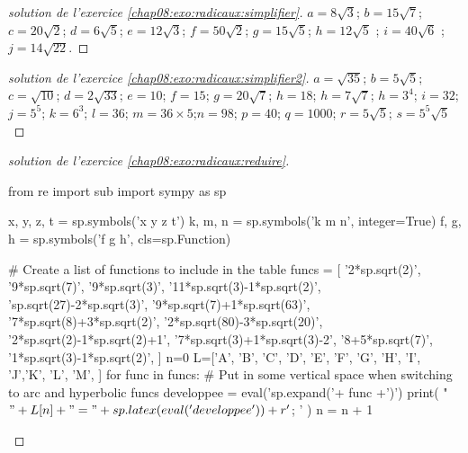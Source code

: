 \documentclass[main.tex]{subfiles}
\begin{document}
 
%	 
\begin{proof}[solution de l'exercice \ref{chap08:exo:radicaux:simplifier}] 
	$a=8\sqrt{3}$; $b=15\sqrt{7}$; $c=20\sqrt{2}$; $d=6\sqrt{5}$; $e=12\sqrt{3}$; $f=50\sqrt{2}$; $g=15\sqrt{5}$; $h=12\sqrt{5}$ ;  $i=40\sqrt{6}$ ;  $j=14\sqrt{22}$. 
\end{proof}
\begin{proof}[solution de l'exercice \ref{chap08:exo:radicaux:simplifier2}] 
 $a=\sqrt{35}$; $b=5\sqrt{5}$; $c=\sqrt{10}$; $d=2\sqrt{33}$; $e=10$; $f=15$; $g=20\sqrt{7}$;
 $h=18$;
 $h=7\sqrt{7}$;
 $h=3^4$;
 $i=32$;
 $j=5^5$; 
 $k=6^3$; $l=36$; $m=36\times 5$;$n=98$; $p=40$; $q=1000$; $r=5\sqrt{5}$; $s=5^5\sqrt{5}$
\end{proof} 
\begin{proof}[solution de l'exercice \ref{chap08:exo:radicaux:reduire}]
\begin{pycode}
from re import sub
import sympy as sp

x, y, z, t = sp.symbols('x y z t')
k, m, n = sp.symbols('k m n', integer=True)
f, g, h = sp.symbols('f g h', cls=sp.Function)

# Create a list of functions to include in the table
funcs = [  '2*sp.sqrt(2)',
'9*sp.sqrt(7)',
'9*sp.sqrt(3)',
'11*sp.sqrt(3)-1*sp.sqrt(2)',
'sp.sqrt(27)-2*sp.sqrt(3)',
'9*sp.sqrt(7)+1*sp.sqrt(63)',
'7*sp.sqrt(8)+3*sp.sqrt(2)', 
'2*sp.sqrt(80)-3*sp.sqrt(20)', 
'2*sp.sqrt(2)-1*sp.sqrt(2)+1', 
'7*sp.sqrt(3)+1*sp.sqrt(3)-2', 
'8+5*sp.sqrt(7)', 
'1*sp.sqrt(3)-1*sp.sqrt(2)',
]
n=0
L=['A', 'B', 'C', 'D', 'E', 'F', 'G', 'H', 'I', 'J','K', 'L', 'M',  ]
for func in funcs:
	# Put in some vertical space when switching to arc and hyperbolic funcs
	developpee =  eval('sp.expand('+ func +')')
	print( "$"+L[n] + "  =" + sp.latex( eval('developpee') )  + r'$; ' )
	n     = n + 1
\end{pycode}
\end{proof}
\end{document}
